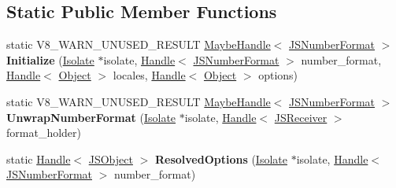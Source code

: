 \subsection*{Static Public Member Functions}
\begin{DoxyCompactItemize}
\item 
\mbox{\label{classv8_1_1internal_1_1JSNumberFormat_aa6d66a00fb622a2df624cc4cb895a311}} 
static V8\+\_\+\+W\+A\+R\+N\+\_\+\+U\+N\+U\+S\+E\+D\+\_\+\+R\+E\+S\+U\+LT \mbox{\hyperlink{classv8_1_1internal_1_1MaybeHandle}{Maybe\+Handle}}$<$ \mbox{\hyperlink{classv8_1_1internal_1_1JSNumberFormat}{J\+S\+Number\+Format}} $>$ {\bfseries Initialize} (\mbox{\hyperlink{classv8_1_1internal_1_1Isolate}{Isolate}} $\ast$isolate, \mbox{\hyperlink{classv8_1_1internal_1_1Handle}{Handle}}$<$ \mbox{\hyperlink{classv8_1_1internal_1_1JSNumberFormat}{J\+S\+Number\+Format}} $>$ number\+\_\+format, \mbox{\hyperlink{classv8_1_1internal_1_1Handle}{Handle}}$<$ \mbox{\hyperlink{classv8_1_1internal_1_1Object}{Object}} $>$ locales, \mbox{\hyperlink{classv8_1_1internal_1_1Handle}{Handle}}$<$ \mbox{\hyperlink{classv8_1_1internal_1_1Object}{Object}} $>$ options)
\item 
\mbox{\label{classv8_1_1internal_1_1JSNumberFormat_aea6b330620a7ce4cfd0148ce4d0293e9}} 
static V8\+\_\+\+W\+A\+R\+N\+\_\+\+U\+N\+U\+S\+E\+D\+\_\+\+R\+E\+S\+U\+LT \mbox{\hyperlink{classv8_1_1internal_1_1MaybeHandle}{Maybe\+Handle}}$<$ \mbox{\hyperlink{classv8_1_1internal_1_1JSNumberFormat}{J\+S\+Number\+Format}} $>$ {\bfseries Unwrap\+Number\+Format} (\mbox{\hyperlink{classv8_1_1internal_1_1Isolate}{Isolate}} $\ast$isolate, \mbox{\hyperlink{classv8_1_1internal_1_1Handle}{Handle}}$<$ \mbox{\hyperlink{classv8_1_1internal_1_1JSReceiver}{J\+S\+Receiver}} $>$ format\+\_\+holder)
\item 
\mbox{\label{classv8_1_1internal_1_1JSNumberFormat_a798a2c76afb2c9d663955dcbfaefe0e2}} 
static \mbox{\hyperlink{classv8_1_1internal_1_1Handle}{Handle}}$<$ \mbox{\hyperlink{classv8_1_1internal_1_1JSObject}{J\+S\+Object}} $>$ {\bfseries Resolved\+Options} (\mbox{\hyperlink{classv8_1_1internal_1_1Isolate}{Isolate}} $\ast$isolate, \mbox{\hyperlink{classv8_1_1internal_1_1Handle}{Handle}}$<$ \mbox{\hyperlink{classv8_1_1internal_1_1JSNumberFormat}{J\+S\+Number\+Format}} $>$ number\+\_\+format)
\item 

\end{DoxyCompactItemize}
